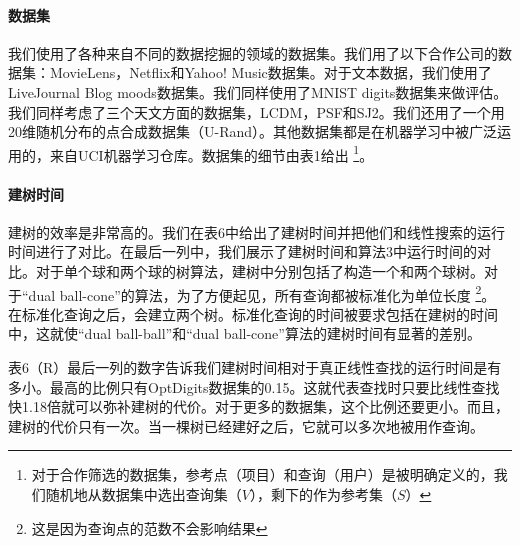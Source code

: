 \documentclass[twocolumn]{article}
\begin{document}
\paragraph{数据集}
我们使用了各种来自不同的数据挖掘的领域的数据集。我们用了以下合作公司的数据集：MovieLens\cite{17}，Netflix\cite{3}和Yahoo! Music\cite{12}数据集。对于文本数据，我们使用了LiveJournal Blog moods数据集\cite{19}。我们同样使用了MNIST digits数据集\cite{24}来做评估。我们同样考虑了三个天文方面的数据集，LCDM\cite{27}，PSF和SJ2。我们还用了一个用20维随机分布的点合成数据集（U-Rand）\cite{5}。其他数据集都是在机器学习中被广泛运用的，来自UCI机器学习仓库。数据集的细节由表1给出
\footnote{对于合作筛选的数据集，参考点（项目）和查询（用户）是被明确定义的，我们随机地从数据集中选出查询集（$V$），剩下的作为参考集（$S$）}。

\paragraph{建树时间}
建树的效率是非常高的。我们在表6中给出了建树时间并把他们和线性搜索的运行时间进行了对比。在最后一列中，我们展示了建树时间和算法3中运行时间的对比。对于单个球和两个球的树算法，建树中分别包括了构造一个和两个球树。对于“dual ball-cone”的算法，为了方便起见，所有查询都被标准化为单位长度
\footnote{这是因为查询点的范数不会影响结果}。
在标准化查询之后，会建立两个树。标准化查询的时间被要求包括在建树的时间中，这就使“dual ball-ball”和“dual ball-cone”算法的建树时间有显著的差别。

表6（R）最后一列的数字告诉我们建树时间相对于真正线性查找的运行时间是有多小。最高的比例只有OptDigits数据集的0.15。这就代表查找时只要比线性查找快1.18倍就可以弥补建树的代价。对于更多的数据集，这个比例还要更小。而且，建树的代价只有一次。当一棵树已经建好之后，它就可以多次地被用作查询。
\end{document}
